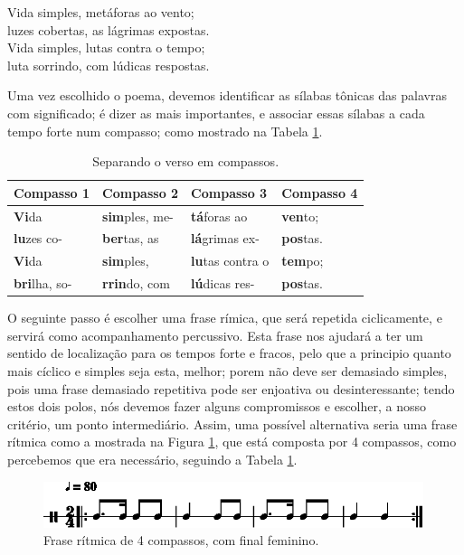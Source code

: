 \begin{citando}
Vida simples, metáforas ao vento;\\
luzes cobertas, as lágrimas expostas.\\
Vida simples, lutas contra o tempo;\\
luta sorrindo, com lúdicas respostas.
\end{citando}

Uma vez escolhido o poema, 
devemos identificar as sílabas tônicas das palavras com significado;
é dizer as mais importantes, e associar essas sílabas a cada tempo forte num compasso;
como mostrado na Tabela \ref{tab:verso1}.

\begin{table}[h!]
\begin{center}
\begin{tabular}{|l||l||l||l|} %
\hline
Compasso 1 & Compasso 2   & Compasso 3   & Compasso 4 \\ \hline \hline
\textbf{Vi}da       & \textbf{sim}ples, me- & \textbf{tá}foras ao    & \textbf{ven}to;  \\ \hline
\textbf{lu}zes  co- & \textbf{ber}tas, as   & \textbf{lá}grimas ex-  & \textbf{pos}tas. \\ \hline
\textbf{Vi}da       & \textbf{sim}ples, & \textbf{lu}tas contra o & \textbf{tem}po;  \\ \hline
\textbf{bri}lha, so-& \textbf{rrin}do, com   & \textbf{lú}dicas res-  & \textbf{pos}tas. \\ \hline
\end{tabular}
\caption{Separando o verso em compassos.}
\label{tab:verso1}
\end{center}
\end{table}

O seguinte passo é escolher uma frase rímica, que será repetida ciclicamente,
 e servirá como acompanhamento percussivo.
Esta frase nos ajudará a ter um sentido de localização para os tempos forte e fracos,
pelo que a principio quanto mais cíclico e simples seja esta, melhor;
porem não deve ser demasiado simples, 
pois uma frase demasiado repetitiva pode ser enjoativa ou desinteressante;
tendo estos dois polos, 
nós devemos fazer alguns compromissos e escolher, a nosso critério, um ponto intermediário. 
Assim, uma possível alternativa seria uma frase rítmica como a mostrada na Figura \ref{rap:emocional-protesto1},
que está composta por 4 compassos, como percebemos que era necessário, 
seguindo a Tabela \ref{tab:verso1}.

\begin{figure}[H]
\centering
    \centering
    \includegraphics[width=0.99\textwidth]{chapters/cap-musicalidade-tecnica/rap-treino-1-1.eps}
\caption{Frase rítmica de 4 compassos, com final feminino.}
\label{rap:emocional-protesto1}
\end{figure}

